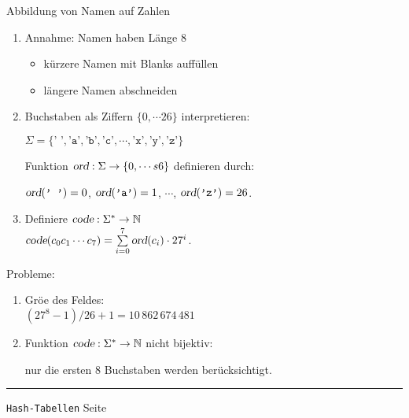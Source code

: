\documentclass{slides}
\newcounter{mypage}
\begin{document}

\begin{slide}{}
\normalsize

\begin{center}
Abbildung von Namen auf Zahlen
\end{center}
\vspace*{0.5cm}

\footnotesize
\begin{enumerate}
\item Annahme: Namen haben L\"ange 8
      \begin{itemize}
      \item k\"urzere Namen mit Blanks auff\"ullen
      \item l\"angere Namen abschneiden
      \end{itemize}
\item Buchstaben als Ziffern $\{0, \cdots 26\}$ interpretieren:
  
      $\Sigma = \{ \texttt{' '}, \texttt{'a'}, \texttt{'b'}, \texttt{'c'}, \cdots, \texttt{'x'}, \texttt{'y'}, \texttt{'z'} \}$ 

      Funktion $\textsl{ord}: \Sigma \rightarrow \{0, \cdots s6\}$ definieren durch: 

      $\textsl{ord}(\texttt{' '}) = 0$, $\textsl{ord}(\texttt{'a'}) = 1$, 
      $\cdots$, $\textsl{ord}(\texttt{'z'}) = 26$.

\item Definiere $\textsl{code}: \Sigma^* \rightarrow \mathbb{N}$ \\[0.2cm]
      \hspace*{1.3cm} 
      $\textsl{code}(c_0c_1\cdots c_7) = \sum\limits_{i=0}^7 \textsl{ord}(c_i) \cdot 27^i$.
\end{enumerate}
Probleme: 
\begin{enumerate}
\item Gr\"o\3e des Feldes: \\[0.2cm]
      \hspace*{1.3cm} $(27^8-1) / 26 + 1 = 10\,862\,674\,481$ \\[0.2cm]
\item Funktion $\textsl{code}: \Sigma^* \rightarrow \mathbb{N}$ nicht bijektiv:
  
      nur die ersten 8 Buchstaben werden ber\"ucksichtigt.
\end{enumerate}

\vspace*{\fill}
\tiny \addtocounter{mypage}{1}
\rule{17cm}{1mm}
\texttt{Hash-Tabellen} \hspace*{\fill} Seite 
\end{slide}
\end{document}
